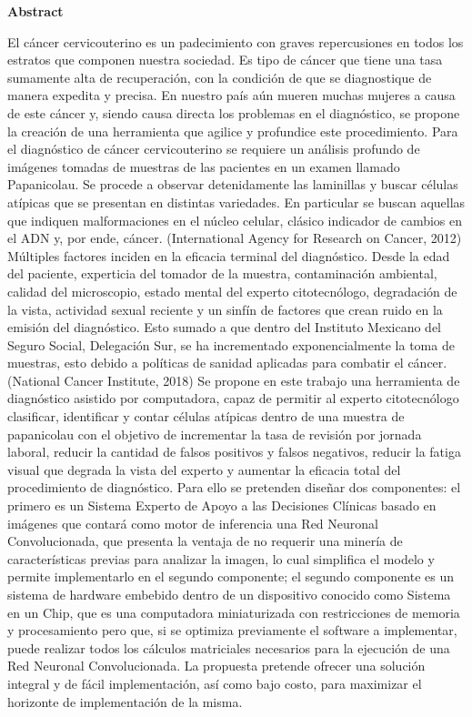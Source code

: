 \begin{center}

    \textbf{Abstract}
\end{center}
El cáncer cervicouterino es un padecimiento con graves repercusiones en todos los estratos que componen nuestra sociedad. Es tipo de cáncer que tiene una tasa sumamente alta de recuperación, con la condición de que se diagnostique de manera expedita y precisa. En nuestro país aún mueren muchas mujeres a causa de este cáncer y, siendo causa directa los problemas en el diagnóstico, se propone la creación de una herramienta que agilice y profundice este procedimiento. Para el diagnóstico de cáncer cervicouterino se requiere un análisis profundo de imágenes tomadas de muestras de las pacientes en un examen llamado Papanicolau. Se procede a observar detenidamente las laminillas y buscar células atípicas que se presentan en distintas variedades. En particular se buscan aquellas que indiquen malformaciones en el núcleo celular, clásico indicador de cambios en el ADN y, por ende, cáncer. (International Agency for Research on Cancer, 2012)
Múltiples factores inciden en la eficacia terminal del diagnóstico. Desde la edad del paciente, experticia del tomador de la muestra, contaminación ambiental, calidad del microscopio, estado mental del experto citotecnólogo, degradación de la vista, actividad sexual reciente y un sinfín de factores que crean ruido en la emisión del diagnóstico. Esto sumado a que dentro del Instituto Mexicano del Seguro Social, Delegación Sur, se ha incrementado exponencialmente la toma de muestras, esto debido a políticas de sanidad aplicadas para combatir el cáncer. (National Cancer Institute, 2018)
Se propone en este trabajo una herramienta de diagnóstico asistido por computadora, capaz de permitir al experto citotecnólogo clasificar, identificar y contar células atípicas dentro de una muestra de papanicolau con el objetivo de incrementar la tasa de revisión por jornada laboral, reducir la cantidad de falsos positivos y falsos negativos, reducir la fatiga visual que degrada la vista del experto y aumentar la eficacia total del procedimiento de diagnóstico.
Para ello se pretenden diseñar dos componentes: el primero es un Sistema Experto de Apoyo a las Decisiones Clínicas basado en imágenes que contará como motor de inferencia una Red Neuronal Convolucionada, que presenta la ventaja de no requerir una minería de características previas para analizar la imagen, lo cual simplifica el modelo y permite implementarlo en el segundo componente; el segundo componente es un sistema de hardware embebido dentro de un dispositivo conocido como Sistema en un Chip, que es una computadora miniaturizada con restricciones de memoria y procesamiento pero que, si se optimiza previamente el software a implementar, puede realizar todos los cálculos matriciales necesarios para la ejecución de una Red Neuronal Convolucionada. 
La propuesta pretende ofrecer una solución integral y de fácil implementación, así como bajo costo, para maximizar el horizonte de implementación de la misma.
